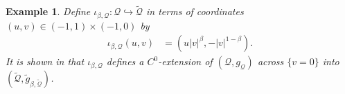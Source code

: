 \documentclass{article}
\newcommand{\Q}{\mathcal{Q}}
\newcommand{\Mw}{M_{\mathrm{wns}}}
\newtheorem{example}[definition]{Example}
\begin{document}
\begin{example}
  Define $\iota_{\beta,\Q}:\Q\hookrightarrow\tilde{\Q}$ in terms of coordinates $(u,v)\in(-1,1)\times(-1,0)$ by
\begin{equation}
    \begin{split}
       \iota_{\beta,\Q}(u,v)&=(u|v|^\beta,-|v|^{1-\beta}).
    \end{split}
\end{equation}
It is shown in \cite[Example 4.1]{CameronSbierski} that $\iota_{\beta,\Q}$ defines a $C^0$-extension of $(\Q,g_\Q)$ across $\{v=0\}$ into $(\tilde{\Q},\tilde{g}_{\beta,\tilde{\Q}})$.


\end{example}
\end{document}

